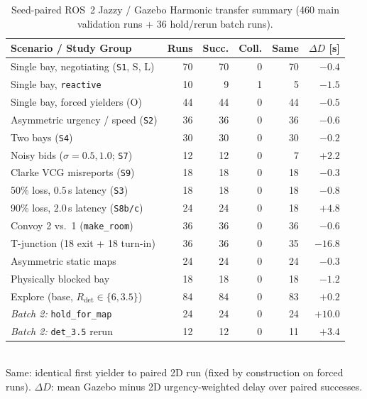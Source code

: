 \documentclass[letterpaper,journal]{IEEEtran}
\begin{document}
\begin{table}[t]\centering
\caption{Seed-paired ROS~2 Jazzy / Gazebo Harmonic transfer summary (460 main validation runs + 36 hold/rerun batch runs).}
\label{tab:gz}
{\footnotesize\setlength{\tabcolsep}{3.0pt}
\begin{tabular}{@{}lrrrrr@{}}\toprule
Scenario / Study Group & Runs & Succ. & Coll. & Same & $\Delta D$ [s] \\\midrule
Single bay, negotiating (\texttt{S1}, S, L) & 70 & 70 & 0 & 70 & $-0.4$ \\
Single bay, \texttt{reactive}               & 10 &  9 & 1 &  5 & $-1.5$ \\
Single bay, forced yielders (O)             & 44 & 44 & 0 & 44 & $-0.5$ \\
Asymmetric urgency / speed (\texttt{S2})    & 36 & 36 & 0 & 36 & $-0.6$ \\
Two bays (\texttt{S4})                      & 30 & 30 & 0 & 30 & $-0.2$ \\
Noisy bids ($\sigma=0.5, 1.0$; \texttt{S7}) & 12 & 12 & 0 &  7 & $+2.2$ \\
Clarke VCG misreports (\texttt{S9})         & 18 & 18 & 0 & 18 & $-0.3$ \\
50\% loss, $0.5$\,s latency (\texttt{S3})   & 18 & 18 & 0 & 18 & $-0.8$ \\
90\% loss, $2.0$\,s latency (\texttt{S8b/c})& 24 & 24 & 0 & 18 & $+4.8$ \\
Convoy 2 vs.\ 1 (\texttt{make\_room})       & 36 & 36 & 0 & 36 & $-0.6$ \\
T-junction (18 exit + 18 turn-in)           & 36 & 36 & 0 & 35 & $-16.8$ \\
Asymmetric static maps                      & 24 & 24 & 0 & 24 & $-0.3$ \\
Physically blocked bay                      & 18 & 18 & 0 & 18 & $-1.2$ \\
Explore (base, $R_{\mathrm{det}}\in\{6,3.5\}$) & 84 & 84 & 0 & 83 & $+0.2$ \\\midrule
\emph{Batch 2:} \texttt{hold\_for\_map}     & 24 & 24 & 0 & 24 & $+10.0$ \\
\emph{Batch 2:} \texttt{det\_3.5} rerun     & 12 & 12 & 0 & 11 & $+3.4$ \\\bottomrule
\end{tabular}}\\[2pt]
{\footnotesize Same: identical first yielder to paired 2D run (fixed by construction on forced runs). $\Delta D$: mean Gazebo minus 2D urgency-weighted delay over paired successes.}
\end{table}
\end{document}
